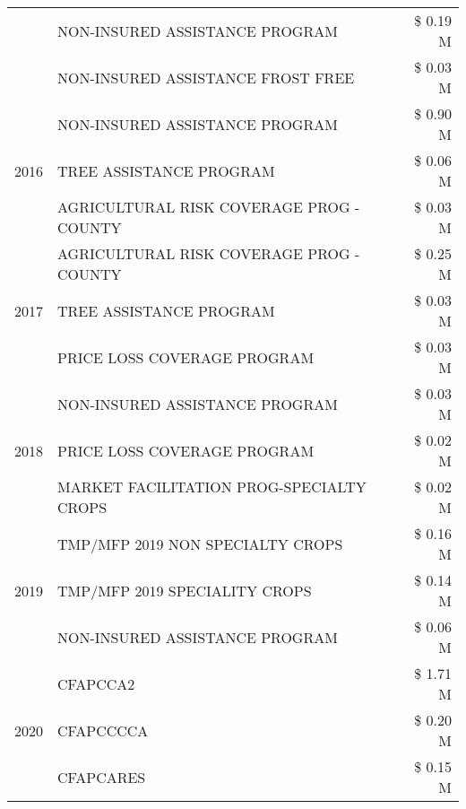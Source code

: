 \begin{tabular}{llr}
 & NON-INSURED ASSISTANCE PROGRAM & \$ 0.19 M \\
 & NON-INSURED ASSISTANCE FROST FREE & \$ 0.03 M \\
\cline{1-3}
\multirow[t]{3}{*}{2016} & NON-INSURED ASSISTANCE PROGRAM & \$ 0.90 M \\
 & TREE ASSISTANCE PROGRAM & \$ 0.06 M \\
 & AGRICULTURAL RISK COVERAGE PROG - COUNTY & \$ 0.03 M \\
\cline{1-3}
\multirow[t]{3}{*}{2017} & AGRICULTURAL RISK COVERAGE PROG - COUNTY & \$ 0.25 M \\
 & TREE ASSISTANCE PROGRAM & \$ 0.03 M \\
 & PRICE LOSS COVERAGE PROGRAM & \$ 0.03 M \\
\cline{1-3}
\multirow[t]{3}{*}{2018} & NON-INSURED ASSISTANCE PROGRAM & \$ 0.03 M \\
 & PRICE LOSS COVERAGE PROGRAM & \$ 0.02 M \\
 & MARKET FACILITATION PROG-SPECIALTY CROPS & \$ 0.02 M \\
\cline{1-3}
\multirow[t]{3}{*}{2019} & TMP/MFP 2019 NON SPECIALTY CROPS & \$ 0.16 M \\
 & TMP/MFP 2019 SPECIALITY CROPS & \$ 0.14 M \\
 & NON-INSURED ASSISTANCE PROGRAM & \$ 0.06 M \\
\cline{1-3}
\multirow[t]{3}{*}{2020} & CFAPCCA2 & \$ 1.71 M \\
 & CFAPCCCCA & \$ 0.20 M \\
 & CFAPCARES & \$ 0.15 M \\
\cline{1-3}
\bottomrule
\end{tabular}
